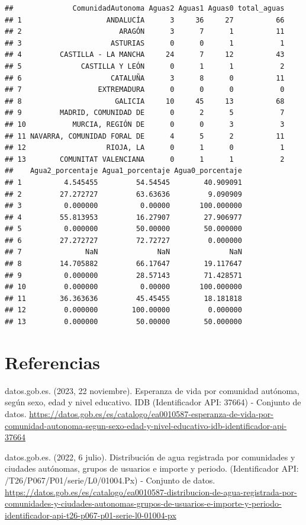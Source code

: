 \documentclass[
]{article}
\begin{document}
\begin{verbatim}
##              ComunidadAutonoma Aguas2 Aguas1 Aguas0 total_aguas
## 1                    ANDALUCÍA      3     36     27          66
## 2                       ARAGÓN      3      7      1          11
## 3                     ASTURIAS      0      0      1           1
## 4         CASTILLA - LA MANCHA     24      7     12          43
## 5              CASTILLA Y LEÓN      0      1      1           2
## 6                     CATALUÑA      3      8      0          11
## 7                  EXTREMADURA      0      0      0           0
## 8                      GALICIA     10     45     13          68
## 9         MADRID, COMUNIDAD DE      0      2      5           7
## 10           MURCIA, REGIÓN DE      0      0      3           3
## 11 NAVARRA, COMUNIDAD FORAL DE      4      5      2          11
## 12                   RIOJA, LA      0      1      0           1
## 13        COMUNITAT VALENCIANA      0      1      1           2
##    Agua2_porcentaje Agua1_porcentaje Agua0_porcentaje
## 1          4.545455         54.54545        40.909091
## 2         27.272727         63.63636         9.090909
## 3          0.000000          0.00000       100.000000
## 4         55.813953         16.27907        27.906977
## 5          0.000000         50.00000        50.000000
## 6         27.272727         72.72727         0.000000
## 7               NaN              NaN              NaN
## 8         14.705882         66.17647        19.117647
## 9          0.000000         28.57143        71.428571
## 10         0.000000          0.00000       100.000000
## 11        36.363636         45.45455        18.181818
## 12         0.000000        100.00000         0.000000
## 13         0.000000         50.00000        50.000000
\end{verbatim}

\hypertarget{referencias}{%
\section{Referencias}\label{referencias}}

datos.gob.es. (2023, 22 noviembre). Esperanza de vida por comunidad
autónoma, según sexo, edad y nivel educativo. IDB (Identificador API:
37664) - Conjunto de datos.
\url{https://datos.gob.es/es/catalogo/ea0010587-esperanza-de-vida-por-comunidad-autonoma-segun-sexo-edad-y-nivel-educativo-idb-identificador-api-37664}

datos.gob.es. (2022, 6 julio). Distribución de agua registrada por
comunidades y ciudades autónomas, grupos de usuarios e importe y
periodo. (Identificador API: /T26/P067/P01/serie/L0/01004.Px) - Conjunto
de datos.
\url{https://datos.gob.es/es/catalogo/ea0010587-distribucion-de-agua-registrada-por-comunidades-y-ciudades-autonomas-grupos-de-usuarios-e-importe-y-periodo-identificador-api-t26-p067-p01-serie-l0-01004-px}
\end{document}
